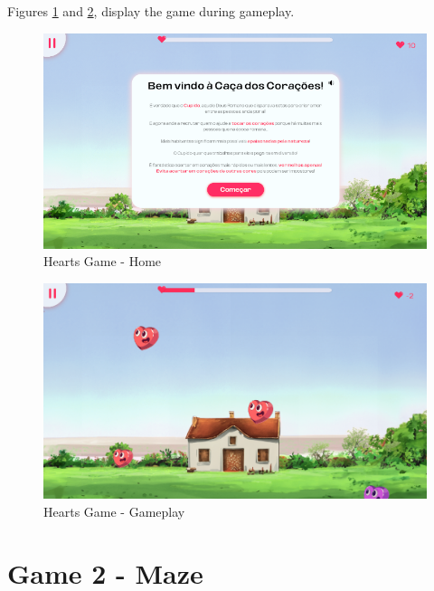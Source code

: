 
Figures \ref{fig:heartsHome} and \ref{fig:heartsGameplay}, display the game during gameplay.

\begin{figure}[H]
    \centering
    \includegraphics[width=0.9\linewidth]{Chapters/gameplay/new_screens/hearts_home.png}
    \caption{Hearts Game - Home}
    \label{fig:heartsHome}    
\end{figure}

\begin{figure}[H]
    \centering
    \includegraphics[width=0.9\linewidth]{Chapters/gameplay/HeartsGame.png}
    \caption{Hearts Game - Gameplay}
    \label{fig:heartsGameplay}    
\end{figure}



\section{Game 2 - Maze}
\label{c3Maze}

